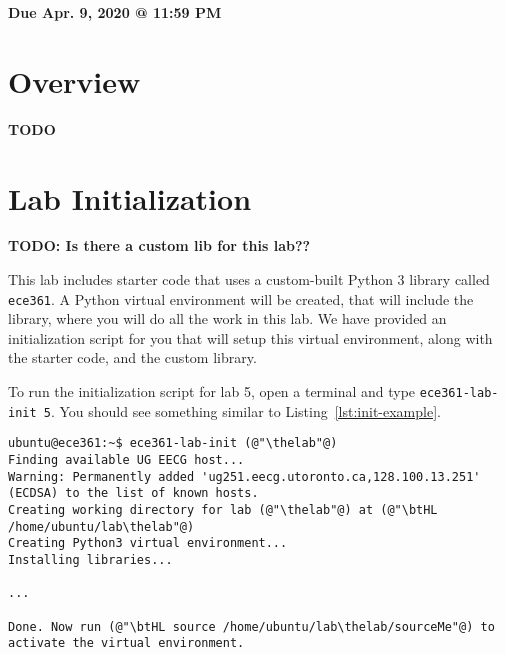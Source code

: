 \documentclass[11pt]{article}
\makeatletter
\def\thelab{5}
\def\datedue{Apr. 9, 2020 @ 11:59 PM}
\makeatother
\begin{document}
\maketitle \thispagestyle{fancy}

\hfill {\large \textbf{Due \datedue}}


\section{Overview}
\label{sec:overview}
\textbf{TODO}

\section{Lab Initialization}
\label{sec:lab-init}
\textbf{TODO: Is there a custom lib for this lab??}

This lab includes starter code that uses a custom-built Python 3 library called \texttt{ece361}.
A Python virtual environment will be created, that will include the library, where you will do all the work in this lab.
We have provided an initialization script for you that will setup this virtual environment, along with the starter code, and the custom library.


To run the initialization script for lab \thelab, open a terminal and type \texttt{ece361-lab-init \thelab}.
You should see something similar to Listing~\ref{lst:init-example}.

\begin{lstlisting}[style=ece361shell, caption={Initializing lab \thelab.}, label={lst:init-example}]
ubuntu@ece361:~$ ece361-lab-init (@"\thelab"@)
Finding available UG EECG host...
Warning: Permanently added 'ug251.eecg.utoronto.ca,128.100.13.251' (ECDSA) to the list of known hosts.
Creating working directory for lab (@"\thelab"@) at (@"\btHL /home/ubuntu/lab\thelab"@)
Creating Python3 virtual environment...
Installing libraries...

...

Done. Now run (@"\btHL source /home/ubuntu/lab\thelab/sourceMe"@) to activate the virtual environment.
\end{lstlisting}
\end{document}
